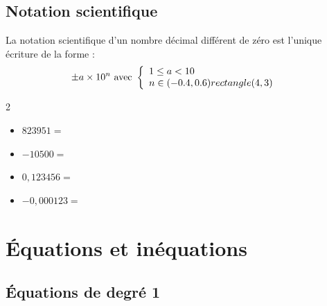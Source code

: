 \subsection{Notation scientifique}

\begin{Définition}
La notation scientifique d'un nombre décimal différent de zéro est l'unique écriture de la forme : 
$$\pm a\times 10^n \text{ avec } \left\{
    \begin{array}{ll}
       1\leq a <  10  & \\
      n\in (-0.4,0.6) rectangle (4,3)  & 
    \end{array}
\right.
$$
\end{Définition}

\begin{Exemples}
\leavevmode\vspace{-\baselineskip}
\vspace{-0.7cm}
\begin{multicols}{2}
\begin{itemize}[label=\textcolor{Couleur10}{$\bullet$}]
\item $823 951=$ \ligne
\item $-10 500=$ \ligne
\item $0, 123 456=$ \ligne
\item $-0,000 123=$ \ligne
\end{itemize}
\end{multicols}
\end{Exemples}



\section{Équations et inéquations}

\subsection{Équations de degré 1}

